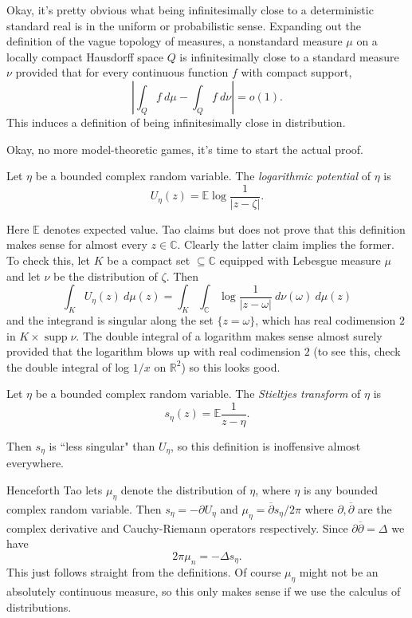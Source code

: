 \documentclass[12pt]{article}
\newcommand{\RR}{\mathbb{R}}
\newcommand{\CC}{\mathbb{C}}
\newcommand{\EE}{\mathbb E}
\newcommand{\supp}{\operatorname{supp}}
\begin{document}
Okay, it's pretty obvious what being infinitesimally close to a deterministic standard real is in the uniform or probabilistic sense.
Expanding out the definition of the vague topology of measures, a nonstandard measure $\mu$ on a locally compact Hausdorff space $Q$ is infinitesimally close to a standard measure $\nu$ provided that for every continuous function $f$ with compact support,
$$\left|\int_Q f~d\mu - \int_Q f~d\nu\right| = o(1).$$
This induces a definition of being infinitesimally close in distribution.

Okay, no more model-theoretic games, it's time to start the actual proof.

\begin{definition}
Let $\eta$ be a bounded complex random variable. The \emph{logarithmic potential} of $\eta$ is
$$U_\eta(z) = \EE \log \frac{1}{|z - \zeta|}.$$
\end{definition}
Here $\EE$ denotes expected value.
Tao claims but does not prove that this definition makes sense for almost every $z \in \CC$.
Clearly the latter claim implies the former.
To check this, let $K$ be a compact set $\subseteq \CC$ equipped with Lebesgue measure $\mu$ and let $\nu$ be the distribution of $\zeta$. Then
$$\int_K U_\eta(z) ~d\mu(z) = \int_K \int_\CC \log \frac{1}{|z - \omega|} ~d\nu(\omega) ~d\mu(z)$$
and the integrand is singular along the set $\{z = \omega\}$, which has real codimension $2$ in $K \times \supp \nu$.
The double integral of a logarithm makes sense almost surely provided that the logarithm blows up with real codimension $2$ (to see this, check the double integral of log $1/x$ on $\RR^2$) so this looks good.

\begin{definition}
Let $\eta$ be a bounded complex random variable. The \emph{Stieltjes transform} of $\eta$ is
$$s_\eta(z) = \EE \frac{1}{z - \eta}.$$
\end{definition}
Then $s_\eta$ is ``less singular" than $U_\eta$, so this definition is inoffensive almost everywhere.

Henceforth Tao lets $\mu_\eta$ denote the distribution of $\eta$, where $\eta$ is any bounded complex random variable.
Then $s_\eta = -\partial U_\eta$ and $\mu_\eta = \overline \partial s_\eta/2\pi$ where $\partial,\overline \partial$ are the complex derivative and Cauchy-Riemann operators respectively.
Since $\partial \overline \partial = \Delta$ we have
$$2\pi\mu_n = -\Delta s_\eta.$$
This just follows straight from the definitions.
Of course $\mu_\eta$ might not be an absolutely continuous measure, so this only makes sense if we use the calculus of distributions.
\end{document}
